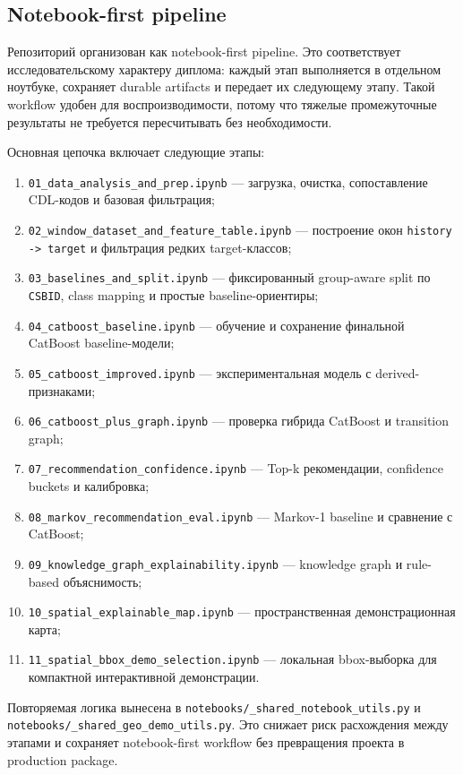 \documentclass[a4paper,article,14pt]{extarticle}
\begin{document}
\subsection{Notebook-first pipeline}

Репозиторий организован как notebook-first pipeline. Это соответствует исследовательскому характеру диплома: каждый этап выполняется в отдельном ноутбуке, сохраняет durable artifacts и передает их следующему этапу. Такой workflow удобен для воспроизводимости, потому что тяжелые промежуточные результаты не требуется пересчитывать без необходимости.

Основная цепочка включает следующие этапы:
\begin{enumerate}
    \item \texttt{01\_data\_analysis\_and\_prep.ipynb} --- загрузка, очистка, сопоставление CDL-кодов и базовая фильтрация;
    \item \texttt{02\_window\_dataset\_and\_feature\_table.ipynb} --- построение окон \texttt{history -> target} и фильтрация редких target-классов;
    \item \texttt{03\_baselines\_and\_split.ipynb} --- фиксированный group-aware split по \texttt{CSBID}, class mapping и простые baseline-ориентиры;
    \item \texttt{04\_catboost\_baseline.ipynb} --- обучение и сохранение финальной CatBoost baseline-модели;
    \item \texttt{05\_catboost\_improved.ipynb} --- экспериментальная модель с derived-признаками;
    \item \texttt{06\_catboost\_plus\_graph.ipynb} --- проверка гибрида CatBoost и transition graph;
    \item \texttt{07\_recommendation\_confidence.ipynb} --- Top-k рекомендации, confidence buckets и калибровка;
    \item \texttt{08\_markov\_recommendation\_eval.ipynb} --- Markov-1 baseline и сравнение с CatBoost;
    \item \texttt{09\_knowledge\_graph\_explainability.ipynb} --- knowledge graph и rule-based объяснимость;
    \item \texttt{10\_spatial\_explainable\_map.ipynb} --- пространственная демонстрационная карта;
    \item \texttt{11\_spatial\_bbox\_demo\_selection.ipynb} --- локальная bbox-выборка для компактной интерактивной демонстрации.
\end{enumerate}

Повторяемая логика вынесена в \texttt{notebooks/\_shared\_notebook\_utils.py} и \texttt{notebooks/\_shared\_geo\_demo\_utils.py}. Это снижает риск расхождения между этапами и сохраняет notebook-first workflow без превращения проекта в production package.
\end{document}
